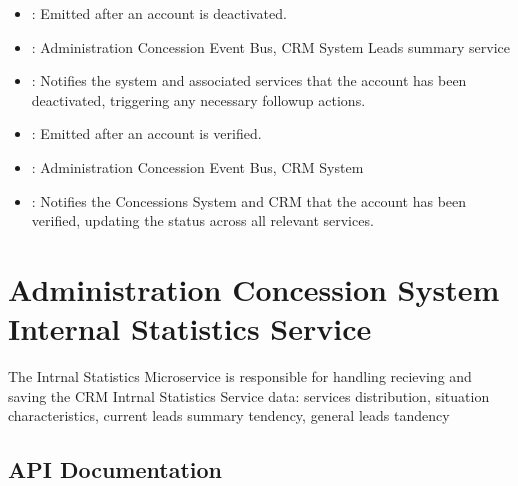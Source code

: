\documentclass[letterpaper,10pt,english]{sphinxmanual}
\begin{document}
\sphinxAtStartPar
{}
\begin{itemize}
\item {} 
\sphinxAtStartPar
{}: Emitted after an account is deactivated.

\item {} 
\sphinxAtStartPar
{}: Administration Concession Event Bus, CRM System Leads summary service

\item {} 
\sphinxAtStartPar
{}: Notifies the system and associated services that the account has been deactivated, triggering any necessary follow\sphinxhyphen{}up actions.

\end{itemize}

\sphinxAtStartPar
{}
\begin{itemize}
\item {} 
\sphinxAtStartPar
{}: Emitted after an account is verified.

\item {} 
\sphinxAtStartPar
{}: Administration Concession Event Bus, CRM System

\item {} 
\sphinxAtStartPar
{}: Notifies the Concessions System and CRM that the account has been verified, updating the status across all relevant services.

\end{itemize}

\sphinxstepscope


\section{Administration Concession System Internal Statistics Service}
\label{\detokenize{administration_concession_system/internal_satistics_service:administration-concession-system-internal-statistics-service}}\label{\detokenize{administration_concession_system/internal_satistics_service::doc}}
\sphinxAtStartPar
The Intrnal Statistics Microservice is responsible for handling recieving and saving  the CRM Intrnal Statistics Service data: services distribution, situation characteristics, current leads summary tendency, general leads tandency


\subsection{API Documentation}
\label{\detokenize{administration_concession_system/internal_satistics_service:api-documentation}}
\end{document}
